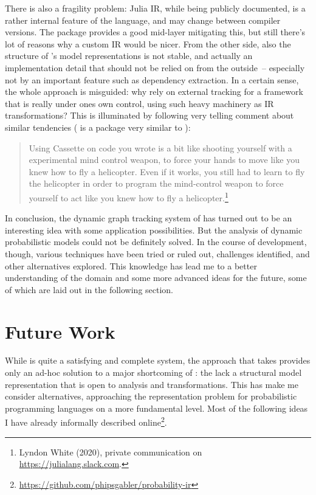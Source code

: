 There is also a fragility problem: Julia IR, while being publicly documented, is a rather internal
feature of the language, and may change between compiler versions.  The 
package provides a good mid-layer mitigating this, but still there's lot of reasons why a custom IR
would be nicer.  From the other side, also the structure of \dppljl{}'s model representations is not
stable, and actually an implementation detail that should not be relied on from the outside~--
especially not by an important feature such as dependency extraction.  In a certain sense, the whole
approach is misguided: why rely on external tracking for a framework that is really under ones own
control, using such heavy machinery as IR transformations?  This is illuminated by following very
telling comment about similar tendencies ( is a package very similar to
):
\begin{quote}
  Using Cassette on code you wrote is a bit like shooting yourself with a experimental mind control
  weapon, to force your hands to move like you knew how to fly a helicopter.  Even if it works, you
  still had to learn to fly the helicopter in order to program the mind-control weapon to force
  yourself to act like you knew how to fly a helicopter.\footnote{Lyndon White (2020), private
    communication on \protect\url{https://julialang.slack.com}.}
\end{quote}

In conclusion, the dynamic graph tracking system of \irtrackerjl{} has turned out to be an
interesting idea with some application possibilities.  But the analysis of dynamic probabilistic
models could not be definitely solved.  In the course of development, though, various techniques
have been tried or ruled out, challenges identified, and other alternatives explored.  This
knowledge has lead me to a better understanding of the domain and some more advanced ideas for the
future, some of which are laid out in the following section.

\section{Future Work}
\label{sec:future-work}

While \irtrackerjl{} is quite a satisfying and complete system, the approach that \autogibbsjl{}
takes provides only an ad-hoc solution to a major shortcoming of \turingjl{}: the lack a structural
model representation that is open to analysis and transformations.  This has make me consider
alternatives, approaching the representation problem for probabilistic programming languages on a
more fundamental level.  Most of the following ideas I have already informally described
online\footnote{\protect\url{https://github.com/phipsgabler/probability-ir}}.

